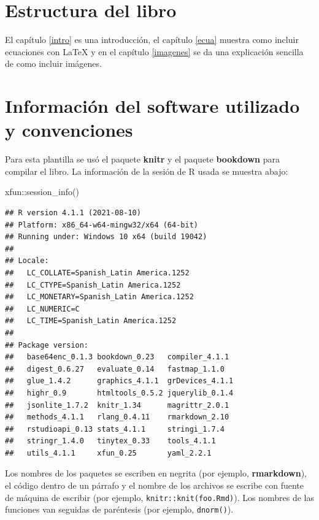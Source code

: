 \documentclass[
]{krantz}
\makeatletter
\newenvironment{Shaded}{\begin{snugshade}}{\end{snugshade}}
\newcommand{\FunctionTok}[1]{\textcolor[rgb]{0,0,0}{#1}}
\newcommand{\NormalTok}[1]{#1}
\newcommand{\SpecialCharTok}[1]{\textcolor[rgb]{0,0,0}{#1}}
\newenvironment{kframe}{%
\medskip{}
\setlength{\fboxsep}{.8em}
 \def\at@end@of@kframe{}%
 \ifinner\ifhmode%
  \def\at@end@of@kframe{\end{minipage}}%
  \begin{minipage}{\columnwidth}%
 \fi\fi%
 \def\FrameCommand##1{\hskip\@totalleftmargin \hskip-\fboxsep
 \colorbox{shadecolor}{##1}\hskip-\fboxsep
     \hskip-\linewidth \hskip-\@totalleftmargin \hskip\columnwidth}%
 \MakeFramed {\advance\hsize-\width
   \@totalleftmargin\z@ \linewidth\hsize
   \@setminipage}}%
 {\par\unskip\endMakeFramed%
 \at@end@of@kframe}
\renewenvironment{Shaded}{\begin{kframe}}{\end{kframe}}
\makeatother
\begin{document}
\hypertarget{estructura-del-libro}{%
\section*{Estructura del libro}\label{estructura-del-libro}}


El capítulo \ref{intro} es una introducción, el capítulo \ref{ecua} muestra como incluir ecuaciones con LaTeX y en el capítulo \ref{imagenes} se da una explicación sencilla de como incluir imágenes.

\hypertarget{informaciuxf3n-del-software-utilizado-y-convenciones}{%
\section*{Información del software utilizado y convenciones}\label{informaciuxf3n-del-software-utilizado-y-convenciones}}


Para esta plantilla se usó el paquete \textbf{knitr} \citep{xie2015} y el paquete \textbf{bookdown} \citep{R-bookdown} para compilar el libro. La información de la sesión de R usada se muestra abajo:

\begin{Shaded}
\begin{Highlighting}[]
\NormalTok{xfun}\SpecialCharTok{::}\FunctionTok{session\_info}\NormalTok{()}
\end{Highlighting}
\end{Shaded}

\begin{verbatim}
## R version 4.1.1 (2021-08-10)
## Platform: x86_64-w64-mingw32/x64 (64-bit)
## Running under: Windows 10 x64 (build 19042)
## 
## Locale:
##   LC_COLLATE=Spanish_Latin America.1252 
##   LC_CTYPE=Spanish_Latin America.1252   
##   LC_MONETARY=Spanish_Latin America.1252
##   LC_NUMERIC=C                          
##   LC_TIME=Spanish_Latin America.1252    
## 
## Package version:
##   base64enc_0.1.3 bookdown_0.23   compiler_4.1.1 
##   digest_0.6.27   evaluate_0.14   fastmap_1.1.0  
##   glue_1.4.2      graphics_4.1.1  grDevices_4.1.1
##   highr_0.9       htmltools_0.5.2 jquerylib_0.1.4
##   jsonlite_1.7.2  knitr_1.34      magrittr_2.0.1 
##   methods_4.1.1   rlang_0.4.11    rmarkdown_2.10 
##   rstudioapi_0.13 stats_4.1.1     stringi_1.7.4  
##   stringr_1.4.0   tinytex_0.33    tools_4.1.1    
##   utils_4.1.1     xfun_0.25       yaml_2.2.1
\end{verbatim}

Los nombres de los paquetes se escriben en negrita (por ejemplo, \textbf{rmarkdown}), el código dentro de un párrafo y el nombre de los archivos se escribe con fuente de máquina de escribir (por ejemplo, \texttt{knitr::knit(\textquotesingle{}foo.Rmd\textquotesingle{})}). Los nombres de las funciones van seguidas de paréntesis (por ejemplo, \texttt{dnorm()}).
\end{document}
